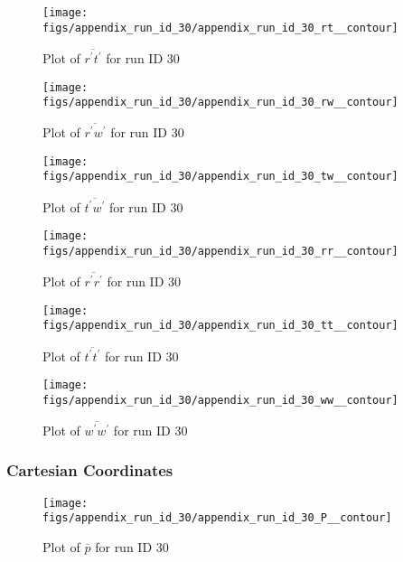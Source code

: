 \begin{figure}[H]
\centering
\texttt{[image: figs/appendix\_run\_id\_30/appendix\_run\_id\_30\_rt\_\_contour]}
\caption{Plot of $\overline{r^\prime t^\prime}$ for run ID 30}
\label{fig:appendix_run_id_30_rt__contour}
\end{figure}


\begin{figure}[H]
\centering
\texttt{[image: figs/appendix\_run\_id\_30/appendix\_run\_id\_30\_rw\_\_contour]}
\caption{Plot of $\overline{r^\prime w^\prime}$ for run ID 30}
\label{fig:appendix_run_id_30_rw__contour}
\end{figure}


\begin{figure}[H]
\centering
\texttt{[image: figs/appendix\_run\_id\_30/appendix\_run\_id\_30\_tw\_\_contour]}
\caption{Plot of $\overline{t^\prime w^\prime}$ for run ID 30}
\label{fig:appendix_run_id_30_tw__contour}
\end{figure}


\begin{figure}[H]
\centering
\texttt{[image: figs/appendix\_run\_id\_30/appendix\_run\_id\_30\_rr\_\_contour]}
\caption{Plot of $\overline{r^\prime r^\prime}$ for run ID 30}
\label{fig:appendix_run_id_30_rr__contour}
\end{figure}


\begin{figure}[H]
\centering
\texttt{[image: figs/appendix\_run\_id\_30/appendix\_run\_id\_30\_tt\_\_contour]}
\caption{Plot of $\overline{t^\prime t^\prime}$ for run ID 30}
\label{fig:appendix_run_id_30_tt__contour}
\end{figure}


\begin{figure}[H]
\centering
\texttt{[image: figs/appendix\_run\_id\_30/appendix\_run\_id\_30\_ww\_\_contour]}
\caption{Plot of $\overline{w^\prime w^\prime}$ for run ID 30}
\label{fig:appendix_run_id_30_ww__contour}
\end{figure}


\subsubsection{Cartesian Coordinates}
\begin{figure}[H]
\centering
\texttt{[image: figs/appendix\_run\_id\_30/appendix\_run\_id\_30\_P\_\_contour]}
\caption{Plot of $\overline{p}$ for run ID 30}
\label{fig:appendix_run_id_30_P__contour}
\end{figure}


